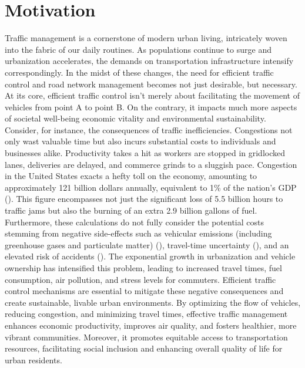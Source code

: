 \chapter{Motivation}

Traffic management is a cornerstone of modern urban living, intricately woven into the fabric of our daily routines. As populations continue to surge and urbanization accelerates, the demands on transportation infrastructure intensify correspondingly. In the midst of these changes, the need for efficient traffic control and road network management becomes not just desirable, but necessary. At its core, efficient traffic control isn't merely about facilitating the movement of vehicles from point A to point B. On the contrary, it impacts much more aspects of societal well-being economic vitality and environmental sustainability. Consider, for instance, the consequences of traffic inefficiencies. Congestions not only wast valuable time but also incurs substantial costs to individuals and businesses alike. Productivity takes a hit as workers are stopped in gridlocked lanes, deliveries are delayed, and commerce grinds to a sluggish pace.  Congestion in the United States exacts a hefty toll on the economy, amounting to approximately 121 billion dollars annually, equivalent to 1\% of the nation's GDP (\cite{schrank2012}). This figure encompasses not just the significant loss of 5.5 billion hours to traffic jams but also the burning of an extra 2.9 billion gallons of fuel. Furthermore, these calculations do not fully consider the potential costs stemming from negative side-effects such as vehicular emissions (including greenhouse gases and particulate matter) (\cite{pant2013}), travel-time uncertainty (\cite{carrion2012}), and an elevated risk of accidents (\cite{hennessy1999}). The exponential growth in urbanization and vehicle ownership has intensified this problem, leading to increased travel times, fuel consumption, air pollution, and stress levels for commuters. Efficient traffic control mechanisms are essential to mitigate these negative consequences and create sustainable, livable urban environments. By optimizing the flow of vehicles, reducing congestion, and minimizing travel times, effective traffic management enhances economic productivity, improves air quality, and fosters healthier, more vibrant communities. Moreover, it promotes equitable access to transportation resources, facilitating social inclusion and enhancing overall quality of life for urban residents. \\
